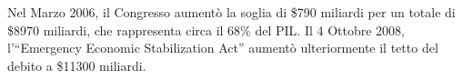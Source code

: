 \documentclass{article}
\begin{document}

Nel Marzo 2006, il Congresso aument\`o la soglia di
\$790 miliardi per un totale di \$8970 miliardi,
che rappresenta circa il 68\% del PIL. Il 4 Ottobre
2008, l'``Emergency Economic Stabilization
Act'' aument\`o ulteriormente il tetto del debito
a \$11300 miliardi.
\end{document}
